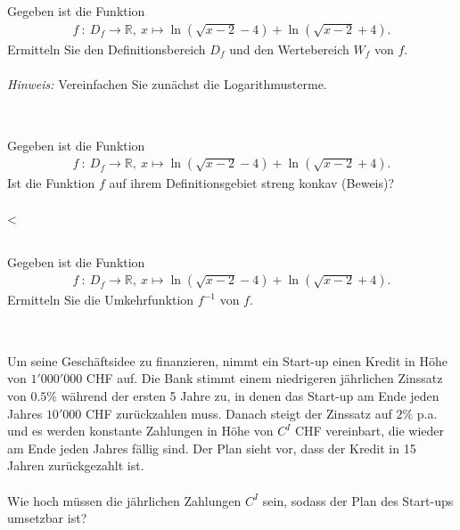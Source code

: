 \subsection*{}
Gegeben ist die Funktion 
\begin{align*}
f  \ : \ D_f \to \mathbb{R},
\
x \mapsto \ln(\sqrt{x-2} - 4 ) + \ln(\sqrt{x-2} + 4).
\end{align*}
Ermitteln Sie den Definitionsbereich $ D_f $ und den Wertebereich $ W_f $ von $ f$.\\
\\
\textit{Hinweis:} Vereinfachen Sie zunächst die Logarithmusterme.
\\
\\
\subsection*{}
Gegeben ist die Funktion 
\begin{align*}
f  \ : \ D_f \to \mathbb{R},
\
x \mapsto \ln(\sqrt{x-2} - 4 ) + \ln(\sqrt{x-2} + 4).
\end{align*}
Ist die Funktion $ f  $ auf ihrem Definitionsgebiet streng konkav (Beweis)?
\\
\\<
\subsection*{}
Gegeben ist die Funktion 
\begin{align*}
f  \ : \ D_f \to \mathbb{R},
\
x \mapsto \ln(\sqrt{x-2} - 4 ) + \ln(\sqrt{x-2} + 4).
\end{align*}
Ermitteln Sie die Umkehrfunktion $ f^{-1} $ von $ f $.
\\
\\
\subsection*{}
Um seine Geschäftsidee zu finanzieren, nimmt ein Start-up einen Kredit in Höhe von
$ 1' 0 00 '0 0 0 $ CHF auf. Die Bank stimmt einem niedrigeren jährlichen Zinssatz von $ 0.5\% $
während der ersten 5 Jahre zu, in denen das Start-up am Ende jeden Jahres $ 10'000 $ CHF
zurückzahlen muss. Danach steigt der Zinssatz auf $ 2 \% $ p.a. und es werden konstante
Zahlungen in Höhe von $ C^I $ CHF vereinbart, die wieder am Ende jeden Jahres fällig sind.
Der Plan sieht vor, dass der Kredit in 15 Jahren zurückgezahlt ist.
\\
\\
Wie hoch müssen die jährlichen Zahlungen $ C^I $ sein, sodass der Plan des Start-ups umsetzbar ist?
\\
\\
